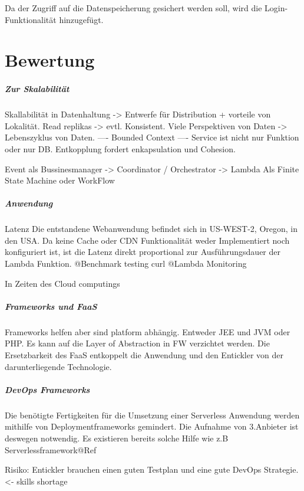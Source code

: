 \documentclass[
12pt,
english,
ngerman,
headsepline,
twoside,
openright,
numbers=noenddot,version=first
]{scrreprt}
\begin{document}
Da der Zugriff auf die Datenspeicherung gesichert werden soll, wird die Login-Funktionalität hinzugefügt.


\chapter{Bewertung}

\paragraph{Zur Skalabilität}
Skallabilität in Datenhaltung -> Entwerfe für Distribution + vorteile von Lokalität.
Read replikas -> evtl. Konsistent. 
Viele Perspektiven von Daten -> Lebenszyklus von Daten. 
---- Bounded Context ---- 
Service ist nicht nur Funktion oder nur DB.
Entkopplung fordert enkapsulation und Cohesion.

Event als Bussinesmanager -> Coordinator / Orchestrator -> Lambda
Als Finite State Machine oder WorkFlow

\paragraph{Anwendung}{Latenz}
Die entstandene Webanwendung befindet sich in US-WEST-2, Oregon, in den USA. 
Da keine Cache oder CDN Funktionalität weder Implementiert noch konfiguriert ist, ist die Latenz direkt proportional zur Ausführungsdauer der Lambda Funktion.
@Benchmark testing curl 
@Lambda Monitoring

In Zeiten des Cloud computings 
\paragraph{Frameworks und FaaS}
Frameworks helfen aber sind platform abhängig. Entweder JEE und JVM oder PHP.
Es kann auf die Layer of Abstraction in FW verzichtet werden. 
Die Ersetzbarkeit des FaaS entkoppelt die Anwendung und den Entickler von der darunterliegende Technologie.

\paragraph{DevOps Frameworks}
Die benötigte Fertigkeiten für die Umsetzung einer Serverless Anwendung werden mithilfe von Deploymentframeworks gemindert. Die Aufnahme von 3.Anbieter ist deswegen notwendig. Es existieren bereits solche Hilfe wie z.B Serverlessframework@Ref

Risiko:
Entickler brauchen einen guten Testplan und eine gute DevOps Strategie.<- skills shortage
\end{document}
